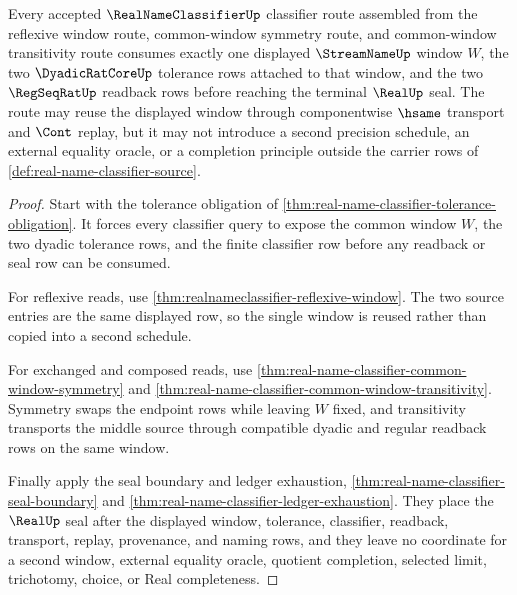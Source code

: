 \begin{theorem}
\label{thm:real-name-classifier-window-coverage}
Every accepted $\RealNameClassifierUp$ classifier route assembled from the reflexive window route, common-window symmetry route, and common-window transitivity route consumes exactly one displayed $\StreamNameUp$ window $W$, the two $\DyadicRatCoreUp$ tolerance rows attached to that window, and the two $\RegSeqRatUp$ readback rows before reaching the terminal $\RealUp$ seal. The route may reuse the displayed window through componentwise $\hsame$ transport and $\Cont$ replay, but it may not introduce a second precision schedule, an external equality oracle, or a completion principle outside the carrier rows of \autoref{def:real-name-classifier-source}.
\end{theorem}
\begin{proof}
Start with the tolerance obligation of \autoref{thm:real-name-classifier-tolerance-obligation}. It forces every classifier query to expose the common window $W$, the two dyadic tolerance rows, and the finite classifier row before any readback or seal row can be consumed.

For reflexive reads, use \autoref{thm:realnameclassifier-reflexive-window}. The two source entries are the same displayed row, so the single window is reused rather than copied into a second schedule.

For exchanged and composed reads, use \autoref{thm:real-name-classifier-common-window-symmetry} and \autoref{thm:real-name-classifier-common-window-transitivity}. Symmetry swaps the endpoint rows while leaving $W$ fixed, and transitivity transports the middle source through compatible dyadic and regular readback rows on the same window.

Finally apply the seal boundary and ledger exhaustion, \autoref{thm:real-name-classifier-seal-boundary} and \autoref{thm:real-name-classifier-ledger-exhaustion}. They place the $\RealUp$ seal after the displayed window, tolerance, classifier, readback, transport, replay, provenance, and naming rows, and they leave no coordinate for a second window, external equality oracle, quotient completion, selected limit, trichotomy, choice, or Real completeness.
\end{proof}

